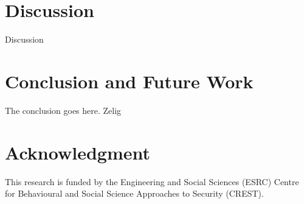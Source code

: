 \documentclass[conference]{IEEEtran}
\begin{document}
\section{Discussion}
Discussion


\section{Conclusion and Future Work}
The conclusion goes here.
Zelig \cite{jones2014finding}


\section*{Acknowledgment}
This research is funded by the Engineering and Social Sciences (ESRC) Centre for Behavioural and Social Science Approaches to Security (CREST).



\printbibliography
\end{document}
